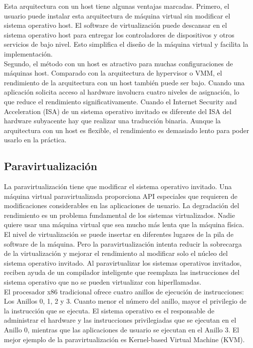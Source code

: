 Esta arquitectura con un host tiene algunas ventajas marcadas. Primero, el usuario puede instalar esta arquitectura de máquina virtual sin modificar el sistema operativo host. El software de virtualización puede descansar en el sistema operativo host para entregar los controladores de dispositivos y otros servicios de bajo nivel. Esto simplifica el diseño de la máquina virtual y facilita la implementación.\\

Segundo, el método con un host es atractivo para muchas configuraciones de máquinas host. Comparado con la arquitectura de hypervisor o VMM, el rendimiento de la arquitectura con un host también puede ser bajo. Cuando una aplicación solicita acceso al hardware involucra cuatro niveles de asignación, lo que reduce el rendimiento significativamente. Cuando el Internet Security and Acceleration (ISA) de un sistema operativo invitado es diferente del ISA del hardware subyacente hay que realizar una traducción binaria. Aunque la arquitectura con un host es flexible, el rendimiento es demasiado lento para poder usarlo en la práctica.

\subsection{Paravirtualización}
La paravirtualización tiene que modificar el sistema operativo invitado. Una máquina virtual paravirtualizada proporciona API especiales que requieren de modificaciones considerables en las aplicaciones de usuario. La degradación del rendimiento es un problema fundamental de los sistemas virtualizados. Nadie quiere usar una máquina virtual que sea mucho más lenta que la máquina física.\\

El nivel de virtualización se puede insertar en diferentes lugares de la pila de software de la máquina. Pero la paravirtualización intenta reducir la sobrecarga de la virtualización y mejorar el rendimiento al modificar solo el núcleo del sistema operativo invitado. Al paravirtualizar los sistemas operativos invitados, reciben ayuda de un compilador inteligente que reemplaza las instrucciones del sistema operativo que no se pueden virtualizar con hiperllamadas.\\

El procesador x86 tradicional ofrece cuatro anillos de ejecución de instrucciones: Los Anillos 0, 1, 2 y 3. Cuanto menor el número del anillo, mayor el privilegio de la instrucción que se ejecuta. El sistema operativo es el responsable de administrar el hardware y las instrucciones privilegiadas que se ejecutan en el Anillo 0, mientras que las aplicaciones de usuario se ejecutan en el Anillo 3. El mejor ejemplo de la paravirtualización es Kernel-based Virtual Machine (KVM).\\

